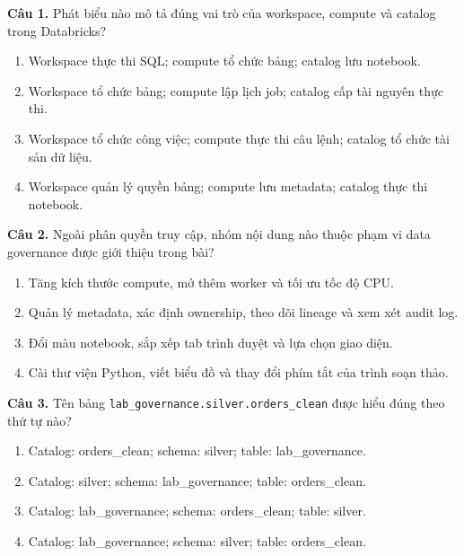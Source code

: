 \noindent\begin{minipage}{\linewidth}
\small
\textbf{Câu 1.} Phát biểu nào mô tả đúng vai trò của workspace, compute và catalog trong Databricks?
\begin{enumerate}[label=\textbf{\Alph*.},leftmargin=2em,itemsep=0pt,topsep=2pt]
\item Workspace thực thi SQL; compute tổ chức bảng; catalog lưu notebook.
\item Workspace tổ chức bảng; compute lập lịch job; catalog cấp tài nguyên thực thi.
\item Workspace tổ chức công việc; compute thực thi câu lệnh; catalog tổ chức tài sản dữ liệu.
\item Workspace quản lý quyền bảng; compute lưu metadata; catalog thực thi notebook.
\end{enumerate}
\end{minipage}\par\addvspace{0.5em}

\noindent\begin{minipage}{\linewidth}
\small
\textbf{Câu 2.} Ngoài phân quyền truy cập, nhóm nội dung nào thuộc phạm vi data governance được giới thiệu trong bài?
\begin{enumerate}[label=\textbf{\Alph*.},leftmargin=2em,itemsep=0pt,topsep=2pt]
\item Tăng kích thước compute, mở thêm worker và tối ưu tốc độ CPU.
\item Quản lý metadata, xác định ownership, theo dõi lineage và xem xét audit log.
\item Đổi màu notebook, sắp xếp tab trình duyệt và lựa chọn giao diện.
\item Cài thư viện Python, viết biểu đồ và thay đổi phím tắt của trình soạn thảo.
\end{enumerate}
\end{minipage}\par\addvspace{0.5em}

\noindent\begin{minipage}{\linewidth}
\small
\textbf{Câu 3.} Tên bảng \texttt{lab\_governance.silver.orders\_clean} được hiểu đúng theo thứ tự nào?
\begin{enumerate}[label=\textbf{\Alph*.},leftmargin=2em,itemsep=0pt,topsep=2pt]
\item Catalog: orders\_clean; schema: silver; table: lab\_governance.
\item Catalog: silver; schema: lab\_governance; table: orders\_clean.
\item Catalog: lab\_governance; schema: orders\_clean; table: silver.
\item Catalog: lab\_governance; schema: silver; table: orders\_clean.
\end{enumerate}
\end{minipage}\par\addvspace{0.5em}

